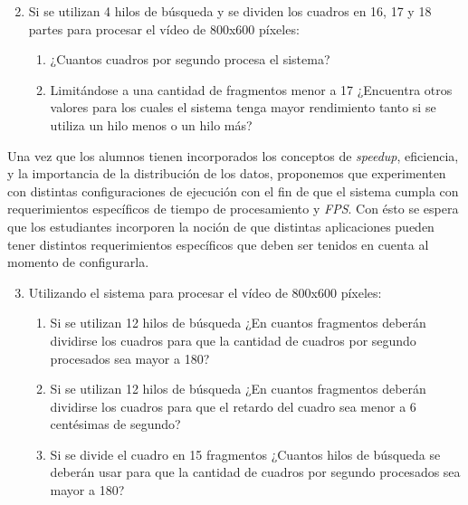 \begin{enumerate}
	
	\setcounter{enumi}{1}

	\item{Si se utilizan 4 hilos de búsqueda y se dividen los cuadros en 16,
		17 y 18 partes para procesar el vídeo de 800x600 píxeles:

\begin{enumerate}

	\item{¿Cuantos cuadros por segundo procesa el sistema?}

	\item{Limitándose a una cantidad de fragmentos menor a 17 ¿Encuentra
		otros valores para los cuales el sistema tenga mayor rendimiento
		tanto si se utiliza un hilo menos o un hilo más?}

\end{enumerate}}


\end{enumerate}

Una vez que los alumnos tienen incorporados los conceptos de \emph{speedup},
eficiencia, y la importancia de la distribución de los datos, proponemos que
experimenten con distintas configuraciones de ejecución con el fin de que el
sistema cumpla con requerimientos específicos de tiempo de procesamiento y
\emph{FPS}. Con ésto se espera que los estudiantes incorporen la noción de que
distintas aplicaciones pueden tener distintos requerimientos específicos que
deben ser tenidos en cuenta al momento de configurarla.

\begin{enumerate}

	\setcounter{enumi}{2}

	\item{Utilizando el sistema para procesar el vídeo de 800x600 píxeles:

\begin{enumerate}

	\item{Si se utilizan 12 hilos de búsqueda ¿En cuantos fragmentos deberán
		dividirse los cuadros para que la cantidad de cuadros por
		segundo procesados sea mayor a 180?}

	\item{Si se utilizan 12 hilos de búsqueda ¿En cuantos fragmentos deberán
		dividirse los cuadros para que el retardo del cuadro sea menor a
		6 centésimas de segundo?}

	\item{Si se divide el cuadro en 15 fragmentos ¿Cuantos hilos de búsqueda
		se deberán usar para que la cantidad de cuadros por segundo
		procesados sea mayor a 180?}

\end{enumerate}}

\end{enumerate}

